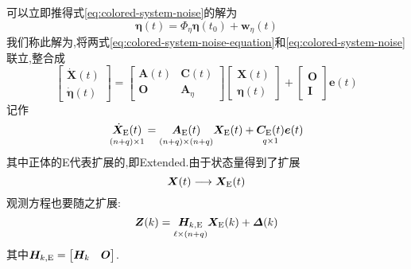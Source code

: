 \documentclass[cn,10pt,citestyle=gb7714-2015,bibstyle=gb7714-2015]{elegantbook}
\renewcommand{\l}{\ell}
\begin{document}
可以立即推得式\eqref{eq:colored-system-noise}的解为
\begin{equation}
  \bm{\eta}(t)=\bm{\varPhi}_\eta\bm{\eta}(t_0)+\bm{w}_\eta(t)
\end{equation}
我们称此解为,将两式\eqref{eq:colored-system-noise-equation}和\eqref{eq:colored-system-noise}联立,整合成
\begin{equation}
  \begin{bmatrix}
    \dot{\bm{X}}(t)\\
    \dot{\bm{\eta}}(t)
  \end{bmatrix}=\begin{bmatrix}
    \bm{A}(t)&\bm{C}(t)\\
    \bm{O}&\bm{A}_\eta
  \end{bmatrix}\begin{bmatrix}
    \bm{X}(t)\\
    \bm{\eta}(t)
  \end{bmatrix}+\begin{bmatrix}
    \bm{O}\\
    \bm{I}
  \end{bmatrix}\bm{e}(t)
\end{equation}
记作
\begin{equation}
  \underset{(n+q)\times 1}{\dot{\bm{X}}_{\textup{E}}(t)}=\underset{(n+q)\times(n+q)}{\bm{A}_{\textup{E}}(t)}\bm{X}_{\textup{E}}(t)+\underset{q\times 1}{\bm{C}_{\textup{E}}(t)}\bm{e}(t)
\end{equation}
其中正体的E代表扩展的,即Extended.由于状态量得到了扩展
\[
  \bm{X}(t)\longrightarrow\bm{X}_{\textup{E}}(t)
\]
观测方程也要随之扩展:
\begin{equation}
  \bm{Z}(k)=\underset{\l\times(n+q)}{\bm{H}_{k,\textup{E}}}\bm{X}_{\textup{E}}(k)+\bm{\varDelta}(k)
\end{equation}
其中$\bm{H}_{k,\textup{E}}=\begin{bmatrix}
  \bm{H}_k&\bm{O}
\end{bmatrix}$.
\end{document}
